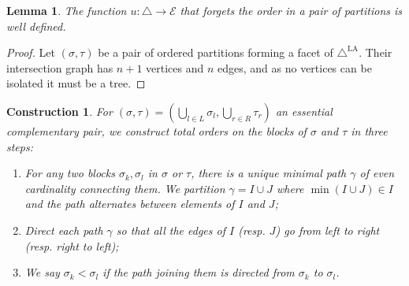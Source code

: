 \documentclass{amsart}
\newtheorem{lemma}[theorem]{Lemma}
\newtheorem{construction}[theorem]{Construction}
\theoremstyle{definition}
\newcommand{\LAD}{\triangle^{\mathrm{LA}}}
\newcommand{\EC}{\mathcal{E}} %
\newcommand{\OP}{\triangle} %
\begin{document}
\begin{lemma} 
\label{l:u-well-defined}
The function $u:\OP \to \EC$ that forgets the order in a pair of partitions is well defined.
\end{lemma}
\begin{proof}
Let $(\sigma,\tau)$ be a pair of ordered partitions forming a facet of $\LAD$. 
Their intersection graph has $n+1$ vertices and $n$ edges, and as no vertices can be isolated it must be a tree. 
\end{proof}

\begin{construction} 
\label{const:total}
For $(\sigma,\tau) = (\bigcup_{l\in L}\sigma_l,\bigcup_{r\in R} \tau_r)$ an essential complementary pair, we construct total orders on the blocks of $\sigma$ and $\tau$ in three steps:
\begin{enumerate}
    \item For any two blocks $\sigma_k,\sigma_l$ in $\sigma$ or $\tau$, there is a unique minimal path $\gamma$ of even cardinality  connecting them.
    We partition $\gamma=I\cup J$ where $\min(I\cup J) \in I$ and the path alternates between elements of $I$ and $J$;
    \item Direct each path $\gamma$ so that all the edges of $I$ (resp. $J$) go from left to right (resp. right to left);
    \item We say $\sigma_k< \sigma_l$ if the path joining them is directed from $\sigma_k$ to $\sigma_l$.
\end{enumerate}
\end{construction}
\end{document}
